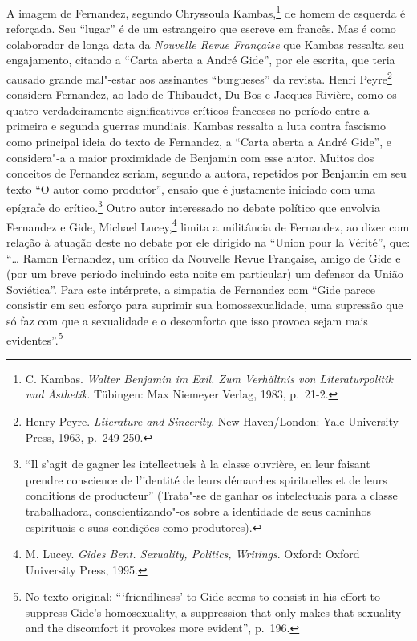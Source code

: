 A imagem de Fernandez, segundo Chryssoula Kambas,\footnote{C. Kambas.
  \emph{Walter Benjamin im Exil. Zum Verhältnis von Literaturpolitik und
  Ästhetik}. Tübingen: Max Niemeyer Verlag, 1983, p.~21-2.} de homem de
esquerda é reforçada. Seu ``lugar'' é de um estrangeiro que escreve em
francês. Mas é como colaborador de longa data da \emph{Nouvelle Revue
Française} que Kambas ressalta seu engajamento, citando a ``Carta aberta
a André Gide'', por ele escrita, que teria causado grande mal"-estar aos
assinantes ``burgueses'' da revista. Henri Peyre\footnote{Henry Peyre.
  \emph{Literature and Sincerity}. New Haven/London: Yale University
  Press, 1963, p.~249-250.} considera Fernandez, ao lado de Thibaudet, Du
Bos e Jacques Rivière, como os quatro verdadeiramente significativos
críticos franceses no período entre a primeira e segunda guerras
mundiais. Kambas ressalta a luta contra fascismo como principal ideia do
texto de Fernandez, a ``Carta aberta a André Gide'', e considera"-a a
maior proximidade de Benjamin com esse autor. Muitos dos conceitos de
Fernandez seriam, segundo a autora, repetidos por Benjamin em seu texto
``O autor como produtor'', ensaio que é justamente iniciado com uma
epígrafe do crítico.\footnote{``Il s'agit de gagner les intellectuels à
  la classe ouvrière, en leur faisant prendre conscience de l'identité
  de leurs démarches spirituelles et de leurs conditions de producteur''
  (Trata"-se de ganhar os intelectuais para a classe trabalhadora,
  conscientizando"-os sobre a identidade de seus caminhos espirituais e
  suas condições como produtores).} Outro autor interessado no debate
político que envolvia Fernandez e Gide, Michael Lucey,\footnote{M.
  Lucey. \emph{Gides Bent. Sexuality, Politics, Writings}. Oxford:
  Oxford University Press, 1995.} limita a militância de Fernandez, ao
dizer com relação à atuação deste no debate por ele dirigido na ``Union
pour la Vérité'', que: ``\ldots{} Ramon Fernandez, um crítico da Nouvelle
Revue Française, amigo de Gide e (por um breve período incluindo esta
noite em particular) um defensor da União Soviética''. Para este
intérprete, a simpatia de Fernandez com ``Gide parece consistir em seu
esforço para suprimir sua homossexualidade, uma supressão que só faz com
que a sexualidade e o desconforto que isso provoca sejam mais
evidentes''.\footnote{No texto original: ```friendliness' to Gide seems
  to consist in his effort to suppress Gide's homosexuality, a
  suppression that only makes that sexuality and the discomfort it
  provokes more evident'', p.~196.}

